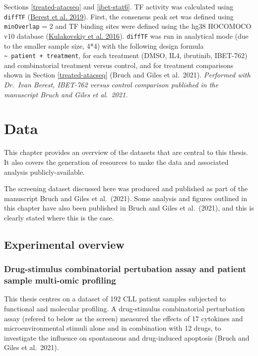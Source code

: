 \documentclass[11pt, a4paper, twosided]{book}
\begin{document}
Sections \ref{treated-atacseq} and \ref{ibet-stat6}. TF activity was calculated using \texttt{diffTF} (\protect\hyperlink{ref-Berest2019}{Berest et al. 2019}). First, the consensus peak set was defined using \texttt{minOverlap} = 2 and TF binding sites were defined using the hg38 HOCOMOCO v10 database (\protect\hyperlink{ref-HOCOMOCO}{Kulakovskiy et al. 2016}). \texttt{diffTF} was run in analytical mode (due to the smaller sample size, 4*4) with the following design formula \texttt{\textasciitilde{}\ patient\ +\ treatment}, for each treatment (DMSO, IL4, ibrutinib, IBET-762) and combinatorial treatment versus control, and for treatment comparisons shown in Section \ref{treated-atacseq} (Bruch and Giles et al.~2021). \emph{Performed with Dr.~Ivan Berest, IBET-762 versus control comparison published in the manuscript Bruch and Giles et al.~2021.}

\hypertarget{data}{%
\chapter{Data}\label{data}}

This chapter provides an overview of the datasets that are central to this thesis. It also covers the generation of resources to make the data and associated analysis publicly-available.

The screening dataset discussed here was produced and published as part of the manuscript Bruch and Giles et al.~(2021). Some analysis and figures outlined in this chapter have also been published in Bruch and Giles et al.~(2021), and this is clearly stated where this is the case.

\hypertarget{experimental-overview}{%
\section{Experimental overview}\label{experimental-overview}}

\hypertarget{the-screen}{%
\subsection{Drug-stimulus combinatorial pertubation assay and patient sample multi-omic profiling}\label{the-screen}}

This thesis centres on a dataset of 192 CLL patient samples subjected to functional and molecular profiling. A drug-stimulus combinatorial perturbation assay (refered to below as the screen) measured the effects of 17 cytokines and microenvironmental stimuli alone and in combination with 12 drugs, to investigate the influence on spontaneous and drug-induced apoptosis (Bruch and Giles et al.~2021).
\end{document}
